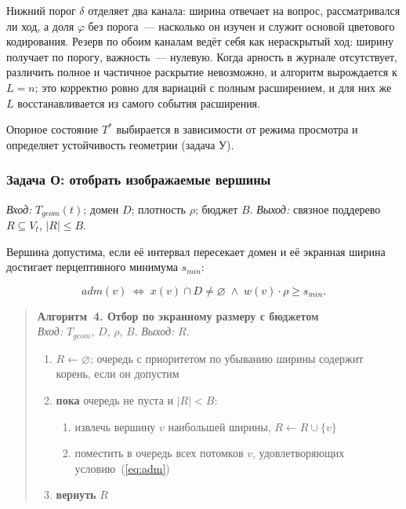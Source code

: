 Нижний порог $\delta$ отделяет два канала: ширина отвечает на вопрос,
рассматривался ли ход, а доля $\varphi$ без порога~--- насколько он изучен и
служит основой цветового кодирования. Резерв по обоим каналам ведёт себя
как нераскрытый ход: ширину получает по порогу, важность~--- нулевую.
Когда арность в журнале отсутствует, различить полное и частичное
раскрытие невозможно, и алгоритм вырождается к $L = n$; это корректно
ровно для вариаций с полным расширением, и для них же $L$ восстанавливается
из самого события расширения.

Опорное состояние $T^{*}$ выбирается в зависимости от режима просмотра и
определяет устойчивость геометрии (задача У).

\subsubsection{Задача О: отобрать изображаемые вершины}

\emph{Вход:} $T_{geom}(t)$; домен $D$; плотность $\rho$; бюджет $B$.
\emph{Выход:} связное поддерево $R \subseteq V_t$, $|R| \le B$.

Вершина допустима, если её интервал пересекает домен и её экранная ширина
достигает перцептивного минимума $s_{min}$:

\begin{equation}
adm(v) \;\Leftrightarrow\; x(v) \cap D \ne \varnothing \;\wedge\;
w(v) \cdot \rho \ge s_{min}.
\label{eq:adm}
\end{equation}

\begin{quote}
\textbf{Алгоритм~4. Отбор по экранному размеру с бюджетом}\\
\emph{Вход:} $T_{geom}$, $D$, $\rho$, $B$. \emph{Выход:} $R$.
\begin{enumerate}
  \item $R \leftarrow \varnothing$; очередь с приоритетом по убыванию
        ширины содержит корень, если он допустим
  \item \textbf{пока} очередь не пуста и $|R| < B$:
  \begin{enumerate}
    \item извлечь вершину $v$ наибольшей ширины, $R \leftarrow R \cup \{v\}$
    \item поместить в очередь всех потомков $v$, удовлетворяющих
          условию~(\ref{eq:adm})
  \end{enumerate}
  \item \textbf{вернуть} $R$
\end{enumerate}
\end{quote}

